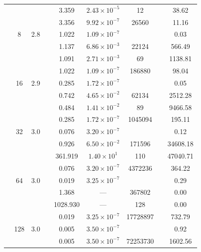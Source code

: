 \begin{table}[htbp]
\begin{tabular}{l S[table-format=3.0] S[table-format=4.1] l S[table-format=3.3] S[table-format=1.2e2] S[table-format=6.0] S[table-format=2.0] S[table-format=4.2]}
     &  &  &  & 3.359 & $2.43 \times 10^{-5}$ & 12 & {\text{---}} & 38.62 \\
     &  &  &  & 3.356 & $9.92 \times 10^{-7}$ & 26560 & {\text{---}} & 11.16 \\
     & 8 & 2.8 &  & 1.022 & $1.09 \times 10^{-7}$ & {\text{---}} & {\text{---}} & 0.03 \\
     &  &  &  & 1.137 & $6.86 \times 10^{-3}$ & 22124 & {\text{---}} & 566.49 \\
     &  &  &  & 1.091 & $2.71 \times 10^{-3}$ & 69 & {\text{---}} & 1138.81 \\
     &  &  &  & 1.022 & $1.09 \times 10^{-7}$ & 186880 & {\text{---}} & 98.04 \\
     & 16 & 2.9 &  & 0.285 & $1.72 \times 10^{-7}$ & {\text{---}} & {\text{---}} & 0.05 \\
     &  &  &  & 0.742 & $4.65 \times 10^{-2}$ & 62134 & {\text{---}} & 2512.28 \\
     &  &  &  & 0.484 & $1.41 \times 10^{-2}$ & 89 & {\text{---}} & 9466.58 \\
     &  &  &  & 0.285 & $1.72 \times 10^{-7}$ & 1045094 & {\text{---}} & 195.11 \\
     & 32 & 3.0 &  & 0.076 & $3.20 \times 10^{-7}$ & {\text{---}} & {\text{---}} & 0.12 \\
     &  &  &  & 0.926 & $6.50 \times 10^{-2}$ & 171596 & {\text{---}} & 34608.18 \\
     &  &  &  & 361.919 & $1.40 \times 10^{1}$ & 110 & {\text{---}} & 47040.71 \\
     &  &  &  & 0.076 & $3.20 \times 10^{-7}$ & 4372236 & {\text{---}} & 364.22 \\
     & 64 & 3.0 &  & 0.019 & $3.25 \times 10^{-7}$ & {\text{---}} & {\text{---}} & 0.29 \\
     &  &  &  & 1.368 & ${\text{---}}$ & 367802 & {\text{---}} & 0.00 \\
     &  &  &  & 1028.930 & ${\text{---}}$ & 128 & {\text{---}} & 0.00 \\
     &  &  &  & 0.019 & $3.25 \times 10^{-7}$ & 17728897 & {\text{---}} & 732.79 \\
     & 128 & 3.0 &  & 0.005 & $3.50 \times 10^{-7}$ & {\text{---}} & {\text{---}} & 0.92 \\
     &  &  &  & 0.005 & $3.50 \times 10^{-7}$ & 72253730 & {\text{---}} & 1602.56 \\

\end{tabular}
\end{table}
